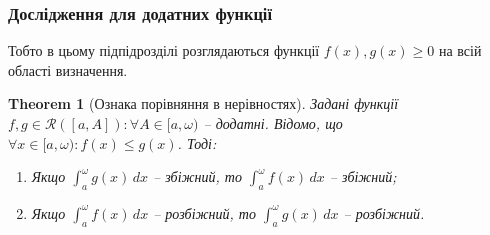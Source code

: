 \documentclass[a4paper, 10pt]{article}
\def\huge{\displaystyle}
\theoremstyle{theoremdd}
\newtheorem{theorem}{Theorem}[subsection]
\theoremstyle{theoremdd}
\theoremstyle{theoremdd}
\theoremstyle{theoremdd}
\theoremstyle{theoremdd}
\theoremstyle{theoremdd}
\theoremstyle{theoremdd}
\theoremstyle{theoremdd}
\theoremstyle{theoremdd}
\begin{document}
\subsubsection{Дослідження для додатних функції}
Тобто в цьому підпідрозділі розглядаються функції $f(x), g(x) \geq 0$ на всій області визначення.
\begin{theorem}[Ознака порівняння в нерівностях]
Задані функції $f,g \in \mathcal{R}([a,A]): \forall A \in [a,\omega)$ -- додатні. Відомо, що $\forall x \in [a,\omega): f(x) \leq g(x)$. Тоді:
\begin{enumerate}[nosep,wide=0pt,label={\arabic*)}]
\item Якщо $\huge\int_a^\omega g(x)\,dx$ -- збіжний, то $\huge\int_a^\omega f(x)\,dx$ -- збіжний;
\item Якщо $\huge\int_a^\omega f(x)\,dx$ -- розбіжний, то $\huge\int_a^\omega g(x)\,dx$ -- розбіжний.
\end{enumerate}
%
\end{theorem}
\end{document}
